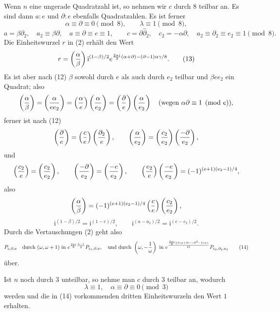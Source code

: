 \documentclass[11pt]{article}
\providecommand{\ii}{\mathrm{i}}
\begin{document}
Wenn $n$ eine ungerade Quadratzahl ist, so nehmen wir $c$ durch $8$ teilbar an. Es sind dann $a:e$ und $\partial:e$ ebenfalls Quadratzahlen. Es ist ferner
\begin{equation}
 \alpha\equiv\partial\equiv0\pmod8,
 \qquad
 \lambda\equiv1\pmod8,
\tag{11}
\end{equation}
\begin{equation}
 a=\beta\partial_2,
 \quad a_2\equiv\beta\partial,
 \quad a\equiv\partial\equiv e\equiv1,
 \qquad
 c=\partial\hat\partial_2,
 \quad c_2=-\alpha\partial,
 \quad a_2\equiv\partial_2\equiv e_2\equiv1
 \pmod8.
\tag{12}
\end{equation}
Die Einheitswurzel $r$ in (2) erhält den Wert
\begin{equation}
 r=\left({\alpha\over\beta}\right)
 \ii^{(1-\beta)/2}e^{{2\pi i\over3}(\alpha+\partial)-(\partial-1)\alpha\gamma/8}.
\tag{13}
\end{equation}
Es ist aber nach (12) $\beta$ sowohl durch $e$ als auch durch $e_2$ teilbar und $\beta ee_2$ ein Quadrat; also
\[
 \left({\alpha\over\beta}\right)=\left({\alpha\over ee_2}\right)
 =\left({\alpha\over e}\right)
 \left({\alpha\over e_2}\right)
 =\left({\partial\over e}\right)
 \left({\alpha\over e_2}\right)
 \quad(\hbox{wegen }\alpha\partial\equiv1\pmod e),
\]
ferner ist nach (12)
\[
 \left({\partial\over e}\right)=\left({c\over e}\right)
 \left({\partial_2\over e}\right),
 \qquad
 \left({\alpha\over e_2}\right)=\left({c_2\over e_2}\right)
 \left({-\partial\over e_2}\right),
\]
und
\[
 \left({c_2\over e}\right)=\left({c_2\over e_2}\right),
 \qquad
 \left({-\partial\over e_2}\right)=\left({-e\over e_2}\right),
 \qquad
 \left({e_2\over e}\right)
 \left({-e\over e_2}\right)=(-1)^{(e+1)(e_2-1)/4},
\]
also
\[
 \left({\alpha\over\beta}\right)=
 (-1)^{(e+1)(e_2-1)/4}
 \left({c\over e}\right)\left({c_2\over e_2}\right),
\]
\[
 \ii^{(1-\beta)/2}=\ii^{(1-e)/2},
 \qquad
 \ii^{(a-a_2)/2}=\ii^{(e-e_2)/2}.
\]
Durch die Vertauschungen (2) geht also
\begin{equation}
 P_{c,\partial,a}\quad\hbox{durch }(\omega,\omega+1)\hbox{ in }
 e^{{2\pi i\over8}{\lambda-1\over2}}P_{c_1,\partial,a},
 \quad
\hbox{und durch }\left(\omega,-{1\over\omega}\right)\hbox{ in }
 e^{{2\pi i\over8}\{\beta(\alpha+\partial)-(\partial^2-1)\alpha\gamma\over4\}}P_{c_2,\partial_2,a_2}
\tag{14}
\end{equation}
über.

Ist $n$ noch durch $3$ unteilbar, so nehme man $c$ durch $3$ teilbar an, wodurch
\[
 \lambda\equiv1,
 \quad \alpha\equiv\partial\equiv0\pmod3
\]
werden und die in (14) vorkommenden dritten Einheitswurzeln den Wert $1$ erhalten.
\end{document}

